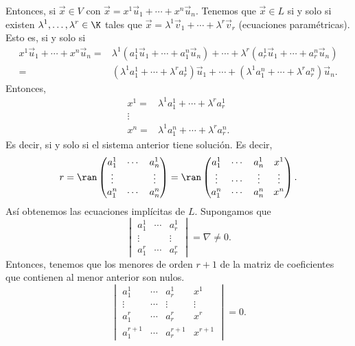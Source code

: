 Entonces, si $\displaystyle \vec{x} \in V $ con $\displaystyle \vec{x} = x^{1}\vec{u}_{1} + \cdots + x^{n}\vec{u}_{n} $. Tenemos que $\displaystyle \vec{x} \in L $ si y solo si existen $\displaystyle \lambda^{1}, \ldots, \lambda^{r} \in \K $ tales que $\displaystyle \vec{x} = \lambda^{1}\vec{v}_{1}+\cdots+\lambda^{r}\vec{v}_{r} $ (ecuaciones paramétricas). Esto es, si y solo si
\[
\begin{split}
	x^{1}\vec{u}_{1} + \cdots + x^{n}\vec{u}_{n} = & \lambda^{1}\left(a^{1}_{1}\vec{u}_{1}+\cdots +a^{n}_{1}\vec{u}_{n}\right) + \cdots + \lambda^{r}\left(a^{1}_{r}\vec{u}_{1}+\cdots+a^{n}_{r}\vec{u}_{n}\right) \\
	= & \left(\lambda^{1}a^{1}_{1}+\cdots + \lambda^{r}a^{1}_{r}\right)\vec{u}_{1} + \cdots + \left(\lambda^{1}a^{n}_{1}+\cdots + \lambda^{r}a^{n}_{r}\right)\vec{u}_{n} .
\end{split}
\]
Entonces, 
\[
\begin{split}
	x^{1} = & \lambda^{1}a^{1}_{1} + \cdots + \lambda^{r}a^{1}_{r} \\
	\vdots & \\
	x^{n} = & \lambda^{1}a^{n}_{1} + \cdots + \lambda^{r}a^{n}_{r}.
\end{split}
\]
Es decir, si y solo si el sistema anterior tiene solución. Es decir, 
\[r = \ran\begin{pmatrix} a^{1}_{1} & \cdots & a^{1}_{n} \\
\vdots & & \vdots \\
a^{n}_{1} & \cdots & a^{n}_{n}\end{pmatrix} = \ran\begin{pmatrix} a^{1}_{1} & \cdots & a^{1}_{n} & x^{1} \\
\vdots & \cdots & \vdots & \vdots \\
a^{n}_{1} & \cdots & a^{n}_{n} & x^{n}\end{pmatrix} .\]
Así obtenemos las ecuaciones implícitas de $\displaystyle L $. Supongamos que 
	\[ \begin{vmatrix} a^{1}_{1} & \cdots & a^{1}_{r} \\
	\vdots & & \vdots \\
a^{r}_{1} & \cdots & a^{r}_{r}\end{vmatrix}= \nabla \neq 0 .\]
Entonces, tenemos que los menores de orden $\displaystyle r+1 $ de la matriz de coeficientes que contienen al menor anterior son nulos.
		\[\begin{vmatrix} a^{1}_{1} & \cdots & a^{1}_{r} & x^{1} \\
		\vdots & \cdots & \vdots & \vdots \\
	a^{r}_{1} & \cdots & a^{r}_{r} & x^{r} \\
a^{r+1}_{1} & \cdots & a^{r+1}_{r} & x^{r+1}\end{vmatrix}  = 0 .\]
